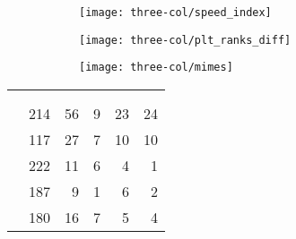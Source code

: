 \begin{figure*}[th]
    \begin{subfigure}[t]{\threecolgrid}
        \texttt{[image: three-col/speed\_index]}
        \sfigcap{}\label{fig:3col-a}
    \end{subfigure}
    \begin{subfigure}[t]{\threecolgrid}
        \texttt{[image: three-col/plt\_ranks\_diff]}
        \sfigcap{}\label{fig:3col-b}
    \end{subfigure}
    \begin{subfigure}[t]{\threecolgrid}
        \texttt{[image: three-col/mimes]}
        \sfigcap{}\label{fig:3col-c}
    \end{subfigure}
    \label{fig:3col}
\end{figure*}

\textcolor{lightgray}{\lipsum[6-7]}

\begin{table}[tb]
    \centering
    \label{tab:sample}
    \begin{tabu}{c|c|r|r|r|r}
        \toprule
         &
             &
             &
            \\
        &
            &
             &
             &  &  \\
        \midrule
            & 214 & 56 & 9 & 23 & 24 \\
            & 117 & 27 & 7 & 10 & 10 \\
            & 222 & 11 & 6 & 4 & 1 \\
            & 187 &  9 & 1 & 6 & 2 \\
            & 180 & 16 & 7 & 5 & 4 \\
        \bottomrule
    \end{tabu}

\end{table}

